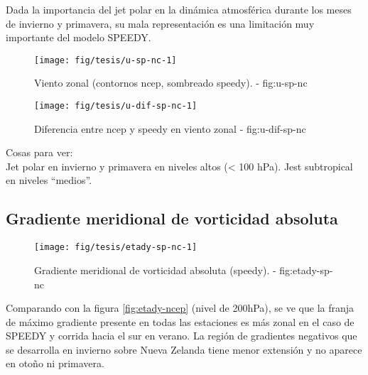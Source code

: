 \documentclass[spanish,a4paper,12p]{book}
\begin{document}
Dada la importancia del jet polar en la dinámica atmosférica durante los
meses de invierno y primavera, su mala representación es una
limitación muy importante del modelo SPEEDY.

\begin{landscape}\begin{figure}

{\centering \texttt{[image: fig/tesis/u-sp-nc-1]} 

}

\caption{Viento zonal (contornos ncep, sombreado speedy). - fig:u-sp-nc}\label{fig:u-sp-nc}
\end{figure}
\end{landscape}

\begin{figure*}
\texttt{[image: fig/tesis/u-dif-sp-nc-1]} \caption{Diferencia entre ncep y speedy en viento zonal - fig:u-dif-sp-nc}\label{fig:u-dif-sp-nc}
\end{figure*}

Cosas para ver:\\
Jet polar en invierno y primavera en niveles altos (\textless{} 100
hPa). Jest subtropical en niveles ``medios''.

\subsection{Gradiente meridional de vorticidad
absoluta}\label{gradiente-meridional-de-vorticidad-absoluta}

\begin{landscape}\begin{figure}

{\centering \texttt{[image: fig/tesis/etady-sp-nc-1]} 

}

\caption{Gradiente meridional de vorticidad absoluta (speedy). - fig:etady-sp-nc}\label{fig:etady-sp-nc}
\end{figure}
\end{landscape}

Comparando con la figura \autoref{fig:etady-ncep} (nivel de 200hPa), se
ve que la franja de máximo gradiente presente en todas las estaciones es
más zonal en el caso de SPEEDY y corrida hacia el sur en verano. La
región de gradientes negativos que se desarrolla en invierno sobre Nueva
Zelanda tiene menor extensión y no aparece en otoño ni primavera.
\end{document}
